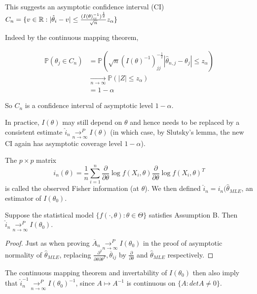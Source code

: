 \documentclass[a4paper]{article}
\begin{document}
This suggests an asymptotic confidence interval (CI) $C_n = \{v \in \mathbb{R} : |\hat{\theta}_i - v| \le  \frac{(I(\theta)^{-1}_{ii})^{\frac{1}{2}}}{\sqrt{n} } z_{\alpha}\} $

Indeed by the continuous mapping theorem,

\begin{align*}
	\mathbb{P}\left( \theta_j \in C_n \right) &= \mathbb{P}\left( \sqrt{n} (I(\theta)^{-1})^{- \frac{1}{2}}_{jj}  |\hat{\theta}_{n,j} - \theta_j| \le  z_{\alpha}\right) \\
	&\underset{n\to \infty}{\to } \mathbb{P}\left( |Z| \le z_{\alpha} \right) \\
	&= 1- \alpha
\end{align*}

So $C_n$ is a confidence interval of asymptotic level $1-\alpha$.

In practice,  $I(\theta)$ may still depend on  $\theta$ and hence needs to be replaced by a consistent estimate $\hat{i}_{n} \underset{n\to \infty}{\to ^{P}}  I(\theta)$ (in which case, by Slutsky's lemma, the new CI again has asymptotic coverage level $1-\alpha$).

 \begin{defn}
	The $p\times p$ matrix
	\[
		i_n(\theta) = \frac{1}{n}\sum_{i=1}^{n} \frac{\partial }{\partial \theta} \log f(X_i, \theta) \frac{\partial }{\partial \theta} \log f(X_i, \theta)^{T} 
	\] 
	is called the observed Fisher information (at $\theta$).
	We then defined  $\hat{i}_n = i_n(\hat{\theta}_{MLE}$, an estimator of $I(\theta_0)$.
\end{defn}

\begin{prop}
	Suppose the statistical model $\{f\left( \cdot , \theta \right) : \theta \in \Theta \}$ satisfies Assumption B. Then $\hat{i}_n \underset{n\to \infty}{\to ^{P}} I(\theta_0) $.
\end{prop}

\begin{proof}
	Just as when proving $\overline{A}_n \underset{n\to \infty}{\to ^{P}} I(\theta_0)$ in the proof of asymptotic normality of $\hat{\theta}_{MLE}$,  replacing $\frac{\partial^2 }{\partial \theta \partial\theta^{T}}, \overline{\theta}_{ij} $ by $\frac{\partial }{\partial \theta} $ and $\hat{\theta}_{MLE}$ respectively.
\end{proof}

\begin{remark}
	The continuous mapping theorem and invertability of $I(\theta_0)$ then also imply that $\hat{i}_n^{-1} \underset{n\to \infty}{\to ^{P}} I(\theta_0)^{-1}$, since $A \mapsto A^{-1} $ is continuous on $\{A : det A \neq 0\} $.  
\end{remark}
\end{document}
